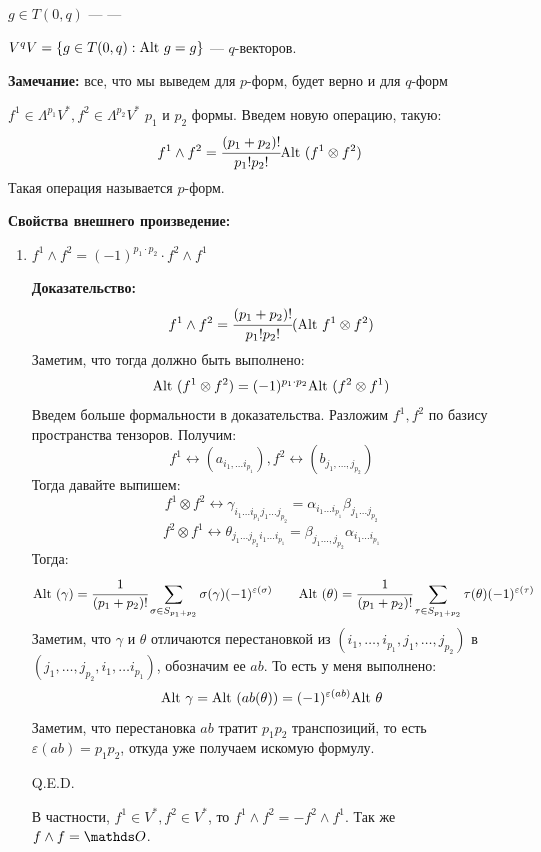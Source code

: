 $g \in T(0,q)$ ---  --- 

$V^qV = \{g\in T(0,q): \text{Alt } g =g\}$ ---  $q$-векторов.

\textbf{Замечание:} все, что мы выведем для $p$-форм, будет верно и для $q$-форм

 $f^1 \in \Lambda^{p_1}V^*,f^2\in \Lambda^{p_2}V^*$ $p_1$ и $p_2$ формы. Введем новую операцию, такую:
$$f^1 \wedge f^2 = \cfrac{(p_1+p_2)!}{p_1!p_2!}\text{Alt } (f^1\otimes f^2)$$
Такая операция называется  $p$-форм.

\textbf{Свойства внешнего произведение:}

\begin{enumerate}
    \item $f^1\wedge f^2 = (-1)^{p_1 \cdot p_2} \cdot  f^2 \wedge f^1$
    
    \textbf{Доказательство:}
    $$f^1 \wedge f^2 = \cfrac{(p_1 + p_2)!}{p_1!p_2!} (\text{Alt } f^1 \otimes f^2)$$
    Заметим, что тогда должно быть выполнено:
    $$\text{Alt } (f^1 \otimes f^2)  = (-1)^{p_1\cdot p_2} \text{Alt }(f^2\otimes f^1)$$
    Введем больше формальности в доказательства. Разложим $f^1,f^2$ по базису пространства тензоров. Получим:
    $$f^1 \leftrightarrow (a_{i_1,\ldots i_{p_1}}), f^2 \leftrightarrow (b_{j_1,\ldots, j_{p_2} }) $$
    Тогда давайте выпишем:
    $$f^1 \otimes f^2 \leftrightarrow \gamma_{i_1\ldots i_{p_1}j_1\ldots j_{p_2}} = \alpha_{i_1\ldots i_{p_1} } \beta_{j_1\ldots j_{p_2}}$$
    $$f^2\otimes f^1 \leftrightarrow \theta_{j_1\ldots j_{p_2} i_1\ldots i_{p_1}}  = \beta_{j_1\ldots, j_{p_2}}\alpha_{i_1\ldots i_{p_1}}$$
    Тогда:
    $$\text{Alt } (\gamma) = \cfrac{1}{(p_1 + p_2)!} \sum\limits_{\sigma \in S_{p_1+p_2}} \sigma(\gamma)(-1)^{\varepsilon(\sigma)} \quad\quad \text{Alt }(\theta) = \cfrac{1}{(p_1+p_2)!} \sum_{\tau \in S_{p_1+p_2}}\tau(\theta)(-1)^{\varepsilon(\tau)}$$
     Заметим, что $\gamma$ и $\theta$ отличаются перестановкой из $(i_1,\ldots,i_{p_1},j_1,\ldots, j_{p_2})$ в $(j_1,\ldots, j_{p_2},i_{1},\ldots i_{p_1})$, обозначим ее $ab$. То есть у меня выполнено:
    $$\text{Alt } \gamma = \text{Alt }(ab(\theta))=(-1)^{\varepsilon(ab)}\text{Alt } \theta$$
    Заметим, что перестановка $ab$ тратит $p_1p_2$ транспозиций, то есть $\varepsilon(ab) = p_1 p_2$, откуда уже получаем искомую формулу.

    \hfill Q.E.D.

    В частности, $f^1\in V^*,f^2\in V^*$, то $f^1 \wedge f^2 = -f^2 \wedge f^1$. Так же $f \wedge f = \zero$. 


\end{enumerate}
